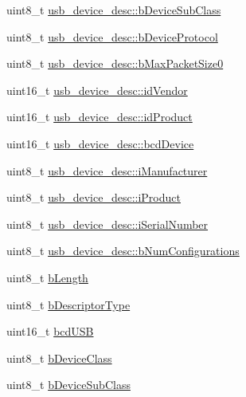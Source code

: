 \begin{DoxyCompactItemize}
\item 
uint8\-\_\-t \hyperlink{group___p_i_o_s___u_s_b___d_e_f_s_ga020d77d32b45dfd9fe9991cd975dddd7}{usb\-\_\-device\-\_\-desc\-::b\-Device\-Sub\-Class}
\item 
uint8\-\_\-t \hyperlink{group___p_i_o_s___u_s_b___d_e_f_s_ga3d64799ad816edeb66ecba053618b8aa}{usb\-\_\-device\-\_\-desc\-::b\-Device\-Protocol}
\item 
uint8\-\_\-t \hyperlink{group___p_i_o_s___u_s_b___d_e_f_s_gaf24518f19202bda273da937e32dff924}{usb\-\_\-device\-\_\-desc\-::b\-Max\-Packet\-Size0}
\item 
uint16\-\_\-t \hyperlink{group___p_i_o_s___u_s_b___d_e_f_s_ga4bafd49b2f07a14cb215c8cfe917ad5a}{usb\-\_\-device\-\_\-desc\-::id\-Vendor}
\item 
uint16\-\_\-t \hyperlink{group___p_i_o_s___u_s_b___d_e_f_s_gad96a4bfe2eaf1a6556d633bb896a8683}{usb\-\_\-device\-\_\-desc\-::id\-Product}
\item 
uint16\-\_\-t \hyperlink{group___p_i_o_s___u_s_b___d_e_f_s_ga4c68faa7a3ea8607c0d9aeb9cc755169}{usb\-\_\-device\-\_\-desc\-::bcd\-Device}
\item 
uint8\-\_\-t \hyperlink{group___p_i_o_s___u_s_b___d_e_f_s_gabaeafe49bb2dac8e1a9d55a693300c6d}{usb\-\_\-device\-\_\-desc\-::i\-Manufacturer}
\item 
uint8\-\_\-t \hyperlink{group___p_i_o_s___u_s_b___d_e_f_s_ga1aa83bdef33f6f67cef07ee0e0cbe7b1}{usb\-\_\-device\-\_\-desc\-::i\-Product}
\item 
uint8\-\_\-t \hyperlink{group___p_i_o_s___u_s_b___d_e_f_s_gae04d0f21a04c4db709e0a05dcb9ecd3a}{usb\-\_\-device\-\_\-desc\-::i\-Serial\-Number}
\item 
uint8\-\_\-t \hyperlink{group___p_i_o_s___u_s_b___d_e_f_s_ga65e3f56a6dc737eb78053a7ad50d75f8}{usb\-\_\-device\-\_\-desc\-::b\-Num\-Configurations}
\item 
uint8\-\_\-t \hyperlink{group___p_i_o_s___u_s_b___d_e_f_s_ga1deca1f1d6e5815b290e6e1015bce5b8}{b\-Length}
\item 
uint8\-\_\-t \hyperlink{group___p_i_o_s___u_s_b___d_e_f_s_ga67d7027b9eb9ed268d28e84fbc675707}{b\-Descriptor\-Type}
\item 
uint16\-\_\-t \hyperlink{group___p_i_o_s___u_s_b___d_e_f_s_ga8f2450b83d08617906b5b63640f559af}{bcd\-U\-S\-B}
\item 
uint8\-\_\-t \hyperlink{group___p_i_o_s___u_s_b___d_e_f_s_gab8e1b1fca77a607c39bba2278623d4f4}{b\-Device\-Class}
\item 
uint8\-\_\-t \hyperlink{group___p_i_o_s___u_s_b___d_e_f_s_ga260eec0b4e7279e6ecae808ca34c2604}{b\-Device\-Sub\-Class}

\end{DoxyCompactItemize}
